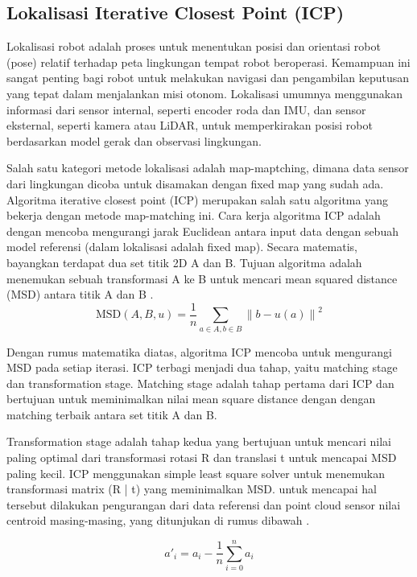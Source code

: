 \subsection{Lokalisasi Iterative Closest Point (ICP)}
Lokalisasi robot adalah proses untuk menentukan posisi dan orientasi robot (pose) relatif terhadap peta lingkungan tempat robot beroperasi. Kemampuan ini sangat penting bagi robot untuk melakukan navigasi dan pengambilan keputusan yang tepat dalam menjalankan misi otonom. Lokalisasi umumnya menggunakan informasi dari sensor internal, seperti encoder roda dan IMU, dan sensor eksternal, seperti kamera atau LiDAR, untuk memperkirakan posisi robot berdasarkan model gerak dan observasi lingkungan. 
\par
Salah satu kategori metode lokalisasi adalah map-maptching, dimana data sensor dari lingkungan dicoba untuk disamakan dengan fixed map yang sudah ada. Algoritma iterative closest point (ICP) merupakan salah satu algoritma yang bekerja dengan metode map-matching ini. Cara kerja algoritma ICP adalah dengan mencoba mengurangi jarak Euclidean antara input data dengan sebuah model referensi (dalam lokalisasi adalah fixed map). Secara matematis, bayangkan terdapat dua set titik 2D A dan B. Tujuan algoritma adalah menemukan sebuah transformasi A ke B untuk mencari mean squared distance (MSD) antara titik A dan B \parencite[]{sobreira2019map}.
\begin{equation}
\text{MSD}(A, B, u) = \frac{1}{n} \sum_{a \in A, b \in B} \left\| b - u(a) \right\|^2
\end{equation}

Dengan rumus matematika diatas, algoritma ICP mencoba untuk mengurangi MSD pada setiap iterasi. ICP terbagi menjadi dua tahap, yaitu matching stage dan transformation stage. Matching stage adalah tahap pertama dari ICP dan bertujuan untuk meminimalkan nilai mean square distance dengan dengan matching terbaik antara set titik A dan B.
\par
Transformation stage adalah tahap kedua yang bertujuan untuk mencari nilai paling optimal dari transformasi rotasi R dan translasi t untuk mencapai MSD paling kecil. ICP menggunakan simple least square solver untuk menemukan transformasi matrix (R | t) yang meminimalkan MSD. untuk mencapai hal tersebut dilakukan pengurangan dari data referensi dan point cloud sensor nilai centroid masing-masing, yang ditunjukan di rumus dibawah \parencite[]{sobreira2019map}.

\begin{equation}
a'_i = a_i - \frac{1}{n} \sum_{i=0}^{n} a_i
\end{equation}

